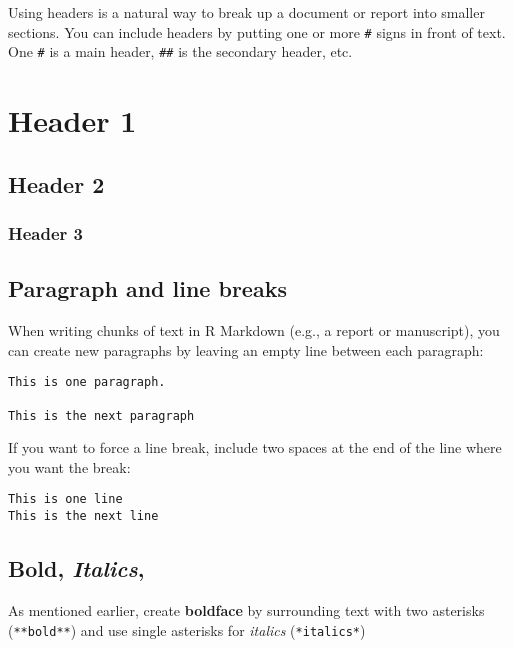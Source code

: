 \documentclass[]{article}
\begin{document}
Using headers is a natural way to break up a document or report into
smaller sections. You can include headers by putting one or more
\texttt{\#} signs in front of text. One \texttt{\#} is a main header,
\texttt{\#\#} is the secondary header, etc.

\hypertarget{header-1}{%
\section{Header 1}\label{header-1}}

\hypertarget{header-2}{%
\subsection{Header 2}\label{header-2}}

\hypertarget{header-3}{%
\subsubsection{Header 3}\label{header-3}}

\hypertarget{paragraph-and-line-breaks}{%
\subsection{Paragraph and line breaks}\label{paragraph-and-line-breaks}}

When writing chunks of text in R Markdown (e.g., a report or
manuscript), you can create new paragraphs by leaving an empty line
between each paragraph:

\begin{verbatim}
This is one paragraph.

This is the next paragraph
\end{verbatim}

If you want to force a line break, include two spaces at the end of the
line where you want the break:

\begin{verbatim}
This is one line  
This is the next line
\end{verbatim}

\hypertarget{bold-italics}{%
\subsection{\texorpdfstring{\textbf{Bold},
\emph{Italics},}{Bold, Italics,}}\label{bold-italics}}

As mentioned earlier, create \textbf{boldface} by surrounding text with
two asterisks (\texttt{**bold**}) and use single asterisks for
\emph{italics} (\texttt{*italics*})
\end{document}
